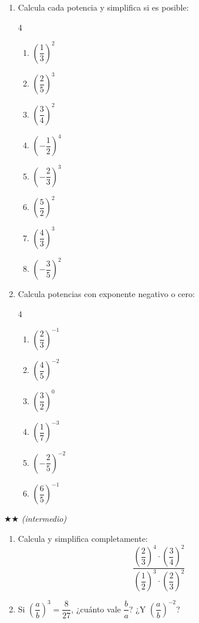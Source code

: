 \documentclass[11pt, letterpaper]{article}
\begin{document}
\begin{enumerate}[label=\textbf{\arabic*.}, leftmargin=*]

\item Calcula cada potencia y simplifica si es posible:
\begin{multicols}{4}
\begin{enumerate}[label=\alph*)]
  \item $\left(\dfrac{1}{3}\right)^2$ \item $\left(\dfrac{2}{5}\right)^3$ \item $\left(\dfrac{3}{4}\right)^2$
  \item $\left(-\dfrac{1}{2}\right)^4$ \item $\left(-\dfrac{2}{3}\right)^3$ \item $\left(\dfrac{5}{2}\right)^2$
  \item $\left(\dfrac{4}{3}\right)^3$ \item $\left(-\dfrac{3}{5}\right)^2$
\end{enumerate}
\end{multicols}

\item Calcula potencias con exponente negativo o cero:
\begin{multicols}{4}
\begin{enumerate}[label=\alph*)]
  \item $\left(\dfrac{2}{3}\right)^{-1}$ \item $\left(\dfrac{4}{5}\right)^{-2}$ \item $\left(\dfrac{3}{2}\right)^{0}$
  \item $\left(\dfrac{1}{7}\right)^{-3}$ \item $\left(-\dfrac{2}{5}\right)^{-2}$ \item $\left(\dfrac{6}{5}\right)^{-1}$
\end{enumerate}
\end{multicols}

\end{enumerate}

$\bigstar\bigstar$ \textit{(intermedio)}

\begin{enumerate}[label=\textbf{\arabic*.}, leftmargin=*, resume]

\item Calcula y simplifica completamente:
$$\frac{\left(\dfrac{2}{3}\right)^4 \cdot \left(\dfrac{3}{4}\right)^2}{\left(\dfrac{1}{2}\right)^3 \cdot \left(\dfrac{2}{3}\right)^2}$$

\item Si $\left(\dfrac{a}{b}\right)^3 = \dfrac{8}{27}$, ¿cu\'anto vale $\dfrac{b}{a}$? ¿Y $\left(\dfrac{a}{b}\right)^{-2}$?

\end{enumerate}
\end{document}
